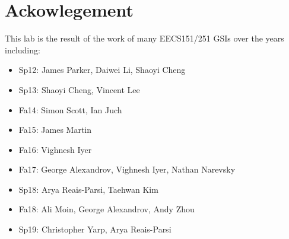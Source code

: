\documentclass[11pt]{article}
\begin{document}
\section*{Ackowlegement}
This lab is the result of the work of many EECS151/251 GSIs over the years including:
\begin{itemize}
\item Sp12: James Parker, Daiwei Li, Shaoyi Cheng
\item Sp13: Shaoyi Cheng, Vincent Lee
\item Fa14: Simon Scott, Ian Juch
\item Fa15: James Martin
\item Fa16: Vighnesh Iyer
\item Fa17: George Alexandrov, Vighnesh Iyer, Nathan Narevsky
\item Sp18: Arya Reais-Parsi, Taehwan Kim
\item Fa18: Ali Moin, George Alexandrov, Andy Zhou
\item Sp19: Christopher Yarp, Arya Reais-Parsi
\end{itemize}
\end{document}
